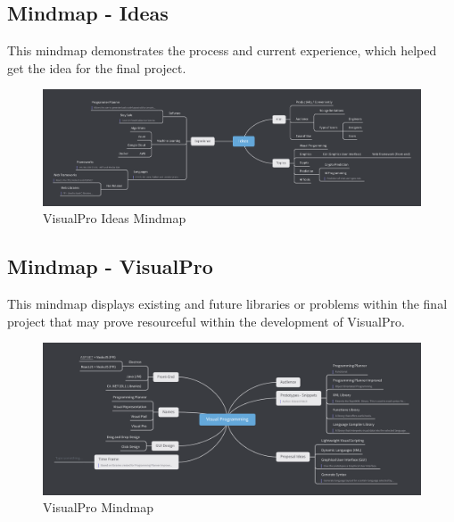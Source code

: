 \documentclass[conference]{IEEEtran}
\begin{document}
      \begin{landscape}
        \thispagestyle{fancylandscape}
        \subsection{Mindmap - Ideas}
        This mindmap demonstrates the process and current experience, which helped get the idea for the final project.
        \begin{figure}[h]
          \includegraphics[height=.83\textheight, width=1.30\textwidth]{Figures/mindmap-ideas.png}
          \caption{VisualPro Ideas Mindmap}
        \end{figure}
      \end{landscape}

      \begin{landscape}
        \thispagestyle{fancylandscape}
        \subsection{Mindmap - VisualPro}
        This mindmap displays existing and future libraries or problems within the final project that may prove resourceful within the development of VisualPro.
        \begin{figure}[h]
          \includegraphics[height=.83\textheight, width=1.30\textwidth]{Figures/mindmap-vp.png}
          \caption{VisualPro Mindmap}
        \end{figure}
      \end{landscape}
\end{document}
